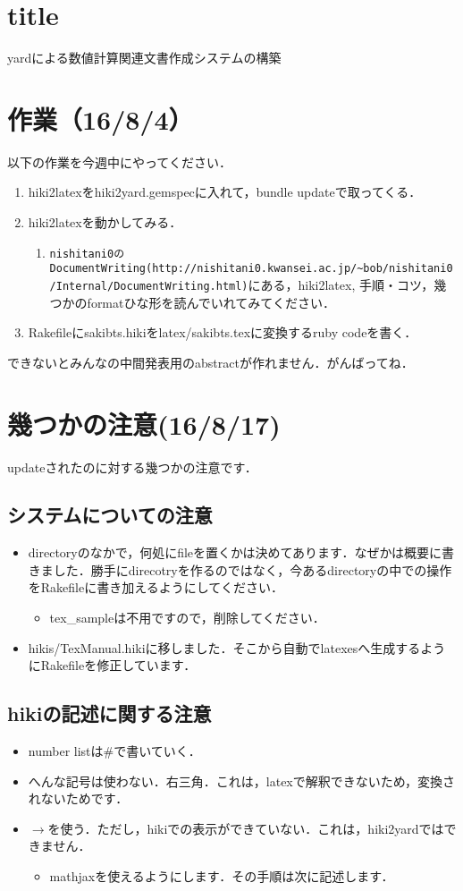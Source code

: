 \documentclass[10pt,a4j,twocolumn]{jsarticle}
\begin{document}
\section{title}
yardによる数値計算関連文書作成システムの構築

\section{作業（16/8/4）}
以下の作業を今週中にやってください．
\begin{enumerate}
\item hiki2latexをhiki2yard.gemspecに入れて，bundle updateで取ってくる．
\item hiki2latexを動かしてみる．\begin{enumerate}
\item \verb|nishitani0のDocumentWriting(http://nishitani0.kwansei.ac.jp/~bob/nishitani0/Internal/DocumentWriting.html)|にある，hiki2latex, 手順・コツ，幾つかのformatひな形を読んでいれてみてください．
\end{enumerate}
\item Rakefileにsakibts.hikiをlatex/sakibts.texに変換するruby codeを書く．
\end{enumerate}
できないとみんなの中間発表用のabstractが作れません．がんばってね．

\section{幾つかの注意(16/8/17)}
updateされたのに対する幾つかの注意です．

\subsection{システムについての注意}\begin{itemize}
\item directoryのなかで，何処にfileを置くかは決めてあります．なぜかは概要に書きました．勝手にdirecotryを作るのではなく，今あるdirectoryの中での操作をRakefileに書き加えるようにしてください．\begin{itemize}
\item tex\_sampleは不用ですので，削除してください．
\end{itemize}
\item hikis/TexManual.hikiに移しました．そこから自動でlatexesへ生成するようにRakefileを修正しています．
\end{itemize}
\subsection{hikiの記述に関する注意}\begin{itemize}
\item number listは\#で書いていく．
\item へんな記号は使わない．右三角．これは，latexで解釈できないため，変換されないためです．
\item $\rightarrow$を使う．ただし，hikiでの表示ができていない．これは，hiki2yardではできません．\begin{itemize}
\item mathjaxを使えるようにします．その手順は次に記述します．
\end{itemize}
\end{itemize}
\end{document}
